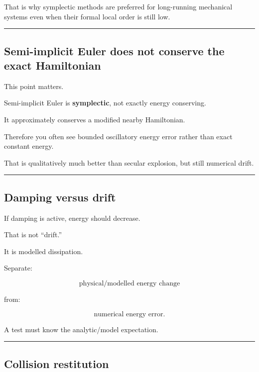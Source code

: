 That is why symplectic methods are preferred for long-running mechanical systems even when their formal local order is still low.

\begin{center}\rule{0.5\linewidth}{0.5pt}\end{center}

\subsection{Semi-implicit Euler does not conserve the exact Hamiltonian}\label{06-engine-ii-ch039-semi-implicit-euler-does-not-conserve-the-exact-hamiltonian}

This point matters.

Semi-implicit Euler is \textbf{symplectic}, not exactly energy conserving.

It approximately conserves a modified nearby Hamiltonian.

Therefore you often see bounded oscillatory energy error rather than exact constant energy.

That is qualitatively much better than secular explosion, but still numerical drift.

\begin{center}\rule{0.5\linewidth}{0.5pt}\end{center}

\subsection{Damping versus drift}\label{06-engine-ii-ch039-damping-versus-drift}

If damping is active, energy should decrease.

That is not ``drift.''

It is modelled dissipation.

Separate:

\[
\boxed{
\text{physical/modelled energy change}
}
\]

from:

\[
\boxed{
\text{numerical energy error}.
}
\]

A test must know the analytic/model expectation.

\begin{center}\rule{0.5\linewidth}{0.5pt}\end{center}

\subsection{Collision restitution}\label{06-engine-ii-ch039-collision-restitution}

